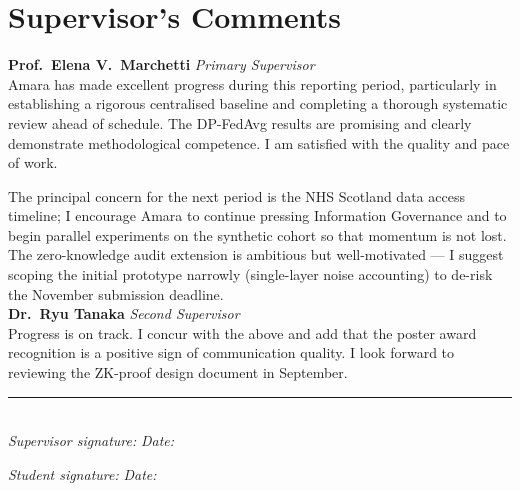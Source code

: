 \section{Supervisor's Comments}

\begin{rvcomment}
\textbf{Prof.\ Elena V.\ Marchetti} \hfill \textit{Primary Supervisor}\\[4pt]
Amara has made excellent progress during this reporting period, particularly in
establishing a rigorous centralised baseline and completing a thorough systematic
review ahead of schedule. The DP-FedAvg results are promising and clearly
demonstrate methodological competence. I am satisfied with the quality and pace
of work.

The principal concern for the next period is the NHS Scotland data access timeline;
I encourage Amara to continue pressing Information Governance and to begin parallel
experiments on the synthetic cohort so that momentum is not lost.
The zero-knowledge audit extension is ambitious but well-motivated — I suggest
scoping the initial prototype narrowly (single-layer noise accounting) to de-risk
the November submission deadline.\\[6pt]

\textbf{Dr.\ Ryu Tanaka} \hfill \textit{Second Supervisor}\\[4pt]
Progress is on track. I concur with the above and add that the poster award
recognition is a positive sign of communication quality. I look forward to
reviewing the ZK-proof design document in September.\\[6pt]

\rule{\linewidth}{0.4pt}\\[3pt]
\textit{Supervisor signature:}\quad\underline{\hspace{50mm}}\quad
\textit{Date:}\quad\underline{\hspace{28mm}}
\end{rvcomment}

\vspace{6pt}
\noindent\textit{Student signature:}\quad\underline{\hspace{50mm}}\quad
\textit{Date:}\quad\underline{\hspace{28mm}}
